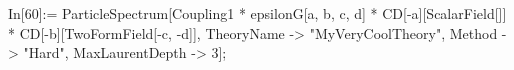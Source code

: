 In[60]:= ParticleSpectrum[Coupling1 * epsilonG[a, b, c, d] * CD[-a][ScalarField[]] * CD[-b][TwoFormField[-c, -d]], TheoryName -> "MyVeryCoolTheory", Method -> "Hard", MaxLaurentDepth -> 3]; 